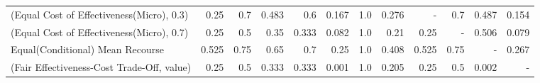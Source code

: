\documentclass{article}
\begin{document}
\begin{table}[ht]
{\begin{tabular}{lrrrrrrrrrrr}
(Equal Cost of Effectiveness(Micro), 0.3)  &                                      0.25 &                                       0.7 &                            0.483 &                              0.6 &               0.167 &                                      1.0 &                                    0.276 &                                         - &                                       0.7 &                            0.487 &                                      0.154 \\
(Equal Cost of Effectiveness(Micro), 0.7)  &                                      0.25 &                                       0.5 &                             0.35 &                            0.333 &               0.082 &                                      1.0 &                                     0.21 &                                      0.25 &                                         - &                            0.506 &                                      0.079 \\
Equal(Conditional) Mean Recourse           &                                     0.525 &                                      0.75 &                             0.65 &                              0.7 &                0.25 &                                      1.0 &                                    0.408 &                                     0.525 &                                      0.75 &                                - &                                      0.267 \\
(Fair Effectiveness-Cost Trade-Off, value) &                                      0.25 &                                       0.5 &                            0.333 &                            0.333 &               0.001 &                                      1.0 &                                    0.205 &                                      0.25 &                                       0.5 &                            0.002 &                                          - \\
\bottomrule
\end{tabular}
}
\end{table}
\end{document}
